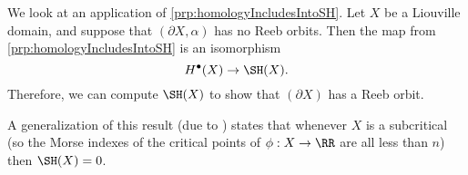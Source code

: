 
\begin{application}
\label{app:weinsteinConjecture}
We look at an application of \cref{prp:homologyIncludesIntoSH}. 
Let $X$ be a Liouville domain, and suppose that $(\partial X, \alpha)$ has no Reeb orbits. Then the map from \cref{prp:homologyIncludesIntoSH} is an isomorphism 
\[H^\bullet(X)\to \SH(X).\]
Therefore, we can compute $\SH(X)$ to show that $(\partial X)$ has a Reeb orbit.  



A generalization of this result (due to \cite{oancea2003suite}) states that whenever $X$ is a subcritical   (so the Morse indexes of the critical points of $\phi: X\to \RR$ are all less than $n$) then $\SH(X)=0$. 
\end{application}